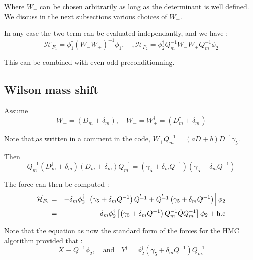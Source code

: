 \documentclass{article}[12pt]
\begin{document}
Where $W_{\pm}$ can be chosen arbitrarily as long as the determinant
is well defined. We discuss in the next subsections various choices of
$W_{\pm}$.

In any case the two term can be evaluated independantly, and we have :
\begin{equation}
\mathcal{H}_{F_1} =   \phi_1^\dagger ( W_- W_+ )^{-1} \phi_1,\quad,
\mathcal{H}_{F_2} = \phi_2^\dagger Q_m^{-1} W_- W_+ Q_m^{-1} \phi_2
\end{equation}


This can be combined with even-odd preconditionning.
\subsection{Wilson mass shift}
Assume
\begin{equation}
W_{+} = \left( D_m + \delta_m\right) ,\quad W_{-} =
W_{+}^\dagger=  \left( D^{\dagger}_m + \delta_m\right)
\end{equation}


Note that,as written in a comment in the code,  $W_+ Q_m^{-1} = (a D +
b ) D^{-1} \gamma_5$.

Then
\begin{equation}
  Q_m^{-1} \left( D^\dagger_m + \delta_m\right)  \left( D_m +
   \delta_m  \right) Q_m^{-1}   =  \left( \gamma_5 + \delta_m Q^{-1}
   \right)  \left( \gamma_5 +    \delta_m Q^{-1}\right)
\end{equation}


The force can then be computed :
\begin{eqnarray}
 \dot{\mathcal{H}_{F_2}}  &=&  - \delta_m \phi_2^\dagger \left[  \left( \gamma_5 + \delta_m Q^{-1}
   \right) \dot{Q^{-1}} + \dot{Q^{-1}} \left( \gamma_5 + \delta_m Q^{-1}
   \right)   \right] \phi_2 \\
&=&  - \delta_m \phi_2^\dagger \left[  \left( \gamma_5 + \delta_m
    Q^{-1}\right) Q_m^{-1} \dot{Q} Q_m^{-1}  \right]\phi_2 + \rm{h.c}
  \end{eqnarray}

Note that the equation as now the standard form of the forces for the
HMC algorithm provided that :
\begin{equation}
X\equiv Q^{-1}\phi_2,\quad\textrm{and}\quad Y^{\dagger}=\phi_2^\dagger
(\gamma_5 + \delta_m Q^{-1}) Q_m^{-1}
\end{equation}
\end{document}
